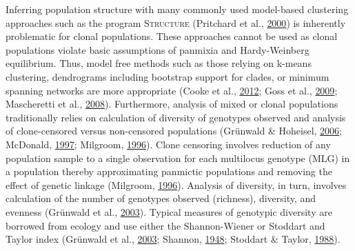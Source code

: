 \documentclass[double,11pt]{beavtex}
\begin{document}
  Inferring population structure with many commonly used model-based
  clustering approaches such as the program \textsc{ Structure} (Pritchard
  et al., \protect\hyperlink{ref-pritchard2000inference}{2000}) is
  inherently problematic for clonal populations. These approaches cannot
  be used as clonal populations violate basic assumptions of panmixia and
  Hardy-Weinberg equilibrium. Thus, model free methods such as those
  relying on k-means clustering, dendrograms including bootstrap support
  for clades, or minimum spanning networks are more appropriate (Cooke et
  al., \protect\hyperlink{ref-cooke2012genome}{2012}; Goss et al.,
  \protect\hyperlink{ref-goss2009population}{2009}; Mascheretti et al.,
  \protect\hyperlink{ref-mascheretti2008reconstruction}{2008}).
  Furthermore, analysis of mixed or clonal populations traditionally
  relies on calculation of diversity of genotypes observed and analysis of
  clone-censored versus non-censored populations (Grünwald \& Hoheisel,
  \protect\hyperlink{ref-grunwald2006hierarchical}{2006}; McDonald,
  \protect\hyperlink{ref-mcdonald1997population}{1997}; Milgroom,
  \protect\hyperlink{ref-milgroom1996recombination}{1996}). Clone
  censoring involves reduction of any population sample to a single
  observation for each multilocus genotype (MLG) in a population thereby
  approximating panmictic populations and removing the effect of genetic
  linkage (Milgroom,
  \protect\hyperlink{ref-milgroom1996recombination}{1996}). Analysis of
  diversity, in turn, involves calculation of the number of genotypes
  observed (richness), diversity, and evenness (Grünwald et al.,
  \protect\hyperlink{ref-grunwald2003analysis}{2003}). Typical measures of
  genotypic diversity are borrowed from ecology and use either the
  Shannon-Wiener or Stoddart and Taylor index (Grünwald et al.,
  \protect\hyperlink{ref-grunwald2003analysis}{2003}; Shannon,
  \protect\hyperlink{ref-shannon2001mathematical}{1948}; Stoddart \&
  Taylor, \protect\hyperlink{ref-stoddart1988genotypic}{1988}).
  
\end{document}
